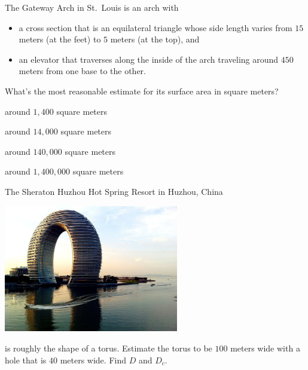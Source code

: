 \documentclass{ximera}
\begin{document}
\begin{exercise}
 The Gateway Arch in St.\ Louis is an arch with
\begin{itemize}
\item a cross section that is an equilateral triangle whose side
  length varies from $15$ meters (at the feet) to $5$ meters (at the
  top), and
\item an elevator that traverses along the inside of the arch
  traveling around $450$ meters from one base to the other.
\end{itemize}
What's the most reasonable estimate for its surface area in square meters?
\begin{enumerate}\begin{multicols}{2}
  \item around $1,400$ square meters
  \item around $14,000$ square meters
  \item around $140,000$ square meters
  \item around $1,400,000$ square meters
  \end{multicols}
  \end{enumerate}
\end{exercise}


\begin{exercise}%
  The Sheraton Huzhou Hot Spring Resort in Huzhou, China
  \begin{center}
    \includegraphics[width=3in]{SheratonHuzhou.jpg}
  \end{center}  
  is roughly the shape of a torus. Estimate the torus to be $100$ meters
  wide with a hole that is $40$ meters wide. Find $D$ and $D_c$.
\end{exercise}
\end{document}
